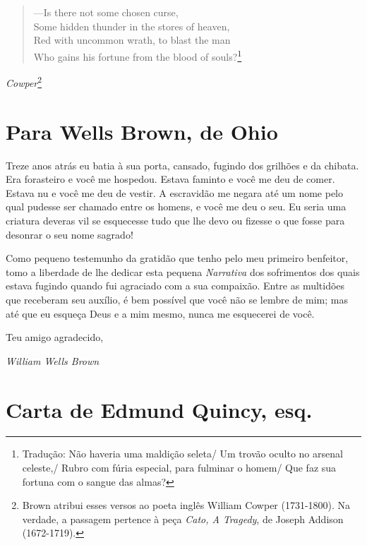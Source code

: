 \chapter*{}
\thispagestyle{empty}
\begin{verse}
---Is there not some chosen curse,\\
Some hidden thunder in the stores of heaven,\\
Red with uncommon wrath, to blast the man\\
Who gains his fortune from the blood of \qb{}souls?\footnote{Tradução: Não haveria uma maldição seleta/ Um trovão oculto no arsenal celeste,/ Rubro com fúria especial, para fulminar o homem/ Que faz sua fortuna com o sangue das almas?}
\end{verse}
\begin{flushright}
\emph{Cowper}\footnote{Brown atribui esses versos ao poeta inglês William
  Cowper (1731-1800). Na verdade, a passagem pertence à peça \emph{Cato,
  A Tragedy}, de Joseph Addison (1672-1719).}
\end{flushright}

\chapter{Para Wells Brown, de Ohio}

Treze anos atrás eu batia à sua porta, cansado, fugindo dos grilhões e
da chibata. Era forasteiro e você me hospedou. Estava faminto e você me
deu de comer. Estava nu e você me deu de vestir. A escravidão me negara
até um nome pelo qual pudesse ser chamado entre os homens, e você me deu
o seu. Eu seria uma criatura deveras vil se esquecesse tudo que lhe devo %
ou fizesse o que fosse para desonrar o seu nome sagrado!

Como pequeno testemunho da gratidão que tenho pelo meu primeiro
benfeitor, tomo a liberdade de lhe dedicar esta pequena \emph{Narrativa} dos
sofrimentos dos quais estava fugindo quando fui agraciado com a sua
compaixão. Entre as multidões que receberam seu auxílio, é bem possível
que você não se lembre de mim; mas até que eu esqueça Deus e a mim
mesmo, nunca me esquecerei de você.

Teu amigo agradecido,

\begin{flushright}
\emph{William Wells Brown}
\end{flushright}

\chapter{Carta de Edmund Quincy, esq.}

